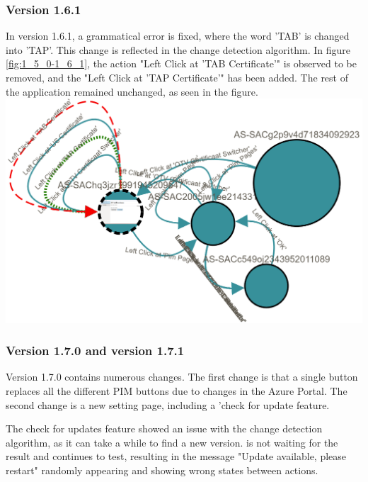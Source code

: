 \subsubsection{Version 1.6.1}
In version 1.6.1, a grammatical error is fixed, where the word 'TAB' is changed into 'TAP'. This change is reflected in the change detection algorithm. In figure \ref{fig:1_5_0-1_6_1}, the action "Left Click at 'TAB Certificate'" is observed to be removed, and the "Left Click at 'TAP Certificate'" has been added. The rest of the application remained unchanged, as seen in the figure. \\
\begingroup
\captionsetup{type=figure}
\includegraphics[scale=0.5]{images/6-Experiment/1_5_0-1_6_1.png}
\label{fig:1_5_0-1_6_1}
\endgroup

\subsubsection{Version 1.7.0 and version 1.7.1}
Version 1.7.0 contains numerous changes. The first change is that a single button replaces all the different PIM buttons due to changes in the Azure Portal. The second change is a new setting page, including a 'check for update feature. 

The check for updates feature showed an issue with the change detection algorithm, as it can take a while to find a new version. \testar is not waiting for the result and continues to test, resulting in the message "Update available, please restart" randomly appearing and showing wrong states between actions. 


